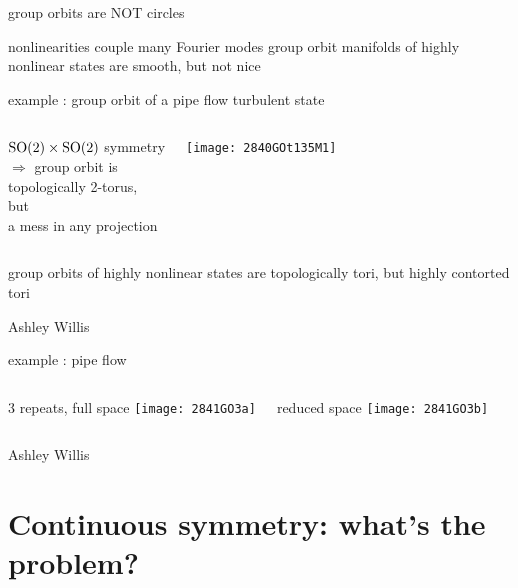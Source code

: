 \begin{frame}{group orbits are NOT circles}
\begin{block}{nonlinearities couple many Fourier modes}
group orbit manifolds of highly nonlinear states are smooth, but not nice
\end{block}
\end{frame}


\begin{frame}{example : group orbit of a pipe flow turbulent state}
	\begin{columns}[t]
			\begin{exampleblock}
{$\textrm{SO}(2)\times\textrm{SO}(2)$ symmetry
\\
$\Rightarrow$
group orbit is
\\
topologically 2-torus,
\\ but
\\
a mess in any projection}
			\end{exampleblock}
\begin{block}
  \centering
\texttt{[image: 2840GOt135M1]} %
\end{block}
	\end{columns}

\bigskip
group orbits of highly nonlinear states are topologically tori,
but highly contorted tori

\vfill
\hfill
Ashley Willis
\end{frame}

\begin{frame}{example : pipe flow \rpo}
  \begin{columns}
\begin{block}{3 repeats, full space}
\texttt{[image: 2841GO3a]}%
\end{block}
\begin{block}{reduced space}
\texttt{[image: 2841GO3b]}%
\end{block}
  \end{columns}
\vfill
Ashley Willis
\end{frame}

\section[Das Problem]{Continuous symmetry: what's the problem?}

